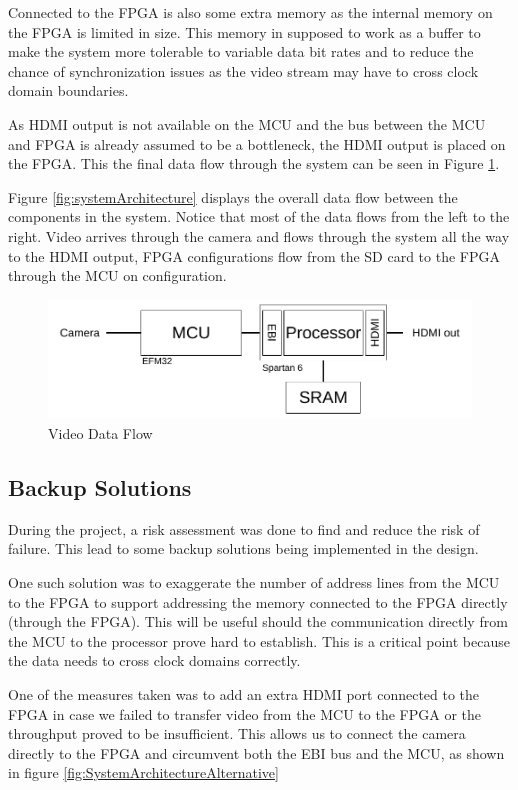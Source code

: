 Connected to the FPGA is also some extra memory as the internal memory on the FPGA is limited in size.
This memory in supposed to work as a buffer to make the system more tolerable to variable data bit rates and to reduce the chance of synchronization issues as the video stream may have to cross clock domain boundaries.

As HDMI output is not available on the MCU and the bus between the MCU and FPGA is already assumed to be a bottleneck, the HDMI output is placed on the FPGA.
This the final data flow through the system can be seen in Figure \ref{fig:VideoDataFlow}.

Figure \ref{fig:systemArchitecture} displays the overall data flow between the components in the system.
Notice that most of the data flows from the left to the right. Video arrives through the camera and flows through the system all the way to the HDMI output, FPGA configurations flow from the SD card to the FPGA through the MCU on configuration.

\begin{figure}
    \includegraphics{img/VideoDataFlow}
    \caption{Video Data Flow}
    \label{fig:VideoDataFlow}
\end{figure}

\subsection{Backup Solutions} \label{subsec:RiskAssessment}
During the project, a risk assessment was done to find and reduce the risk of failure.
This lead to some backup solutions being implemented in the design.

One such solution was to exaggerate the number of address lines from the MCU to the FPGA to support addressing the memory connected to the FPGA directly (through the FPGA).
This will be useful should the communication directly from the MCU to the processor prove hard to establish.
This is a critical point because the data needs to cross clock domains correctly.

One of the measures taken was to add an extra HDMI port connected to the FPGA in case we failed to transfer video from the MCU to the FPGA or the throughput proved to be insufficient.
This allows us to connect the camera directly to the FPGA and circumvent both the EBI bus and the MCU, as shown in figure \ref{fig:SystemArchitectureAlternative}

